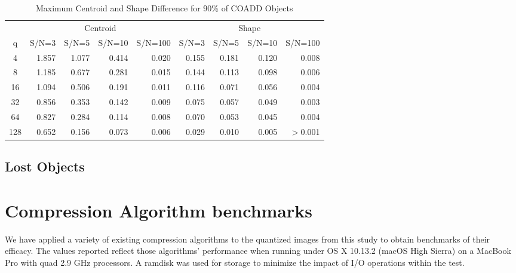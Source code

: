 \begin{table}
\caption{Maximum Centroid and Shape Difference for 90\% of COADD Objects}
\centering
\begin{tabular}[]{c|rrrr|rrrr}
\hline
     &  \multicolumn{4}{c}{Centroid}  & \multicolumn{4}{c}{Shape} \\
 q   &  S/N=3 & S/N=5 & S/N=10 & S/N=100 & S/N=3 & S/N=5 & S/N=10 & S/N=100  \\
\hline
   4 & 1.857 & 1.077 & 0.414 &  0.020   &  0.155 & 0.181 & 0.120 &  0.008 \\
   8 & 1.185 & 0.677 & 0.281 &  0.015   &  0.144 & 0.113 & 0.098 &  0.006 \\
  16 & 1.094 & 0.506 & 0.191 &  0.011   &  0.116 & 0.071 & 0.056 &  0.004 \\
  32 & 0.856 & 0.353 & 0.142 &  0.009   &  0.075 & 0.057 & 0.049 &  0.003 \\
  64 & 0.827 & 0.284 & 0.114 &  0.008   &  0.070 & 0.053 & 0.045 &  0.004 \\
 128 & 0.652 & 0.156 & 0.073 &  0.006   &  0.029 & 0.010 & 0.005 &  $>$0.001 \\
\hline
\end{tabular}
\label{tab_coadd_cen_shape_diff}
\end{table}

\subsection{Lost Objects}


\clearpage

\section{Compression Algorithm benchmarks}

We have applied a variety of existing compression algorithms to the quantized images from this study to 
obtain benchmarks of their efficacy.  The values reported reflect those algorithms' performance when
running under OS X 10.13.2 (macOS High Sierra) on a MacBook Pro with quad 2.9 GHz processors.  A ramdisk
was used for storage to minimize the impact of I/O operations within the test.  

